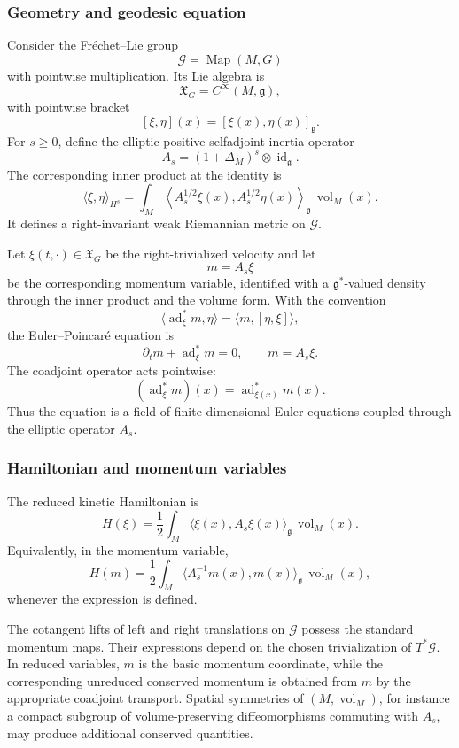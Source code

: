 \documentclass[11pt,reqno]{amsart}
\begin{document}
\subsubsection*{Geometry and geodesic equation}

Consider the Fréchet--Lie group
\[
\mathcal G=\operatorname{Map}(M,G)
\]
with pointwise multiplication. Its Lie algebra is
\[
\mathfrak X_G=C^\infty(M,\mathfrak g),
\]
with pointwise bracket
\[
[\xi,\eta](x)=[\xi(x),\eta(x)]_{\mathfrak g}.
\]
For $s\geq0$, define the elliptic positive selfadjoint inertia operator
\[
A_s=(1+\Delta_M)^s\otimes\operatorname{id}_{\mathfrak g}.
\]
The corresponding inner product at the identity is
\[
\langle\xi,\eta\rangle_{H^s}
=
\int_M
\left\langle
A_s^{1/2}\xi(x),A_s^{1/2}\eta(x)
\right\rangle_{\mathfrak g}
\,\operatorname{vol}_M(x).
\]
It defines a right-invariant weak Riemannian metric on $\mathcal G$.

Let $\xi(t,\cdot)\in\mathfrak X_G$ be the right-trivialized velocity and
let
\[
m=A_s\xi
\]
be the corresponding momentum variable, identified with a
$\mathfrak g^*$-valued density through the inner product and the volume
form. With the convention
\[
\langle\operatorname{ad}_\xi^*m,\eta\rangle
=
\langle m,[\eta,\xi]\rangle,
\]
the Euler--Poincaré equation is
\[
\partial_t m+\operatorname{ad}_\xi^*m=0,
\qquad
m=A_s\xi.
\]
The coadjoint operator acts pointwise:
\[
(\operatorname{ad}_\xi^*m)(x)
=
\operatorname{ad}_{\xi(x)}^*m(x).
\]
Thus the equation is a field of finite-dimensional Euler equations
coupled through the elliptic operator $A_s$.

\subsubsection*{Hamiltonian and momentum variables}

The reduced kinetic Hamiltonian is
\[
H(\xi)
=
\frac12
\int_M
\langle\xi(x),A_s\xi(x)\rangle_{\mathfrak g}
\,\operatorname{vol}_M(x).
\]
Equivalently, in the momentum variable,
\[
H(m)
=
\frac12
\int_M
\langle A_s^{-1}m(x),m(x)\rangle_{\mathfrak g}
\,\operatorname{vol}_M(x),
\]
whenever the expression is defined.

The cotangent lifts of left and right translations on $\mathcal G$
possess the standard momentum maps. Their expressions depend on the
chosen trivialization of $T^*\mathcal G$. In reduced variables, $m$ is
the basic momentum coordinate, while the corresponding unreduced
conserved momentum is obtained from $m$ by the appropriate coadjoint
transport. Spatial symmetries of $(M,\operatorname{vol}_M)$, for
instance a compact subgroup of volume-preserving diffeomorphisms
commuting with $A_s$, may produce additional conserved quantities.
\end{document}
